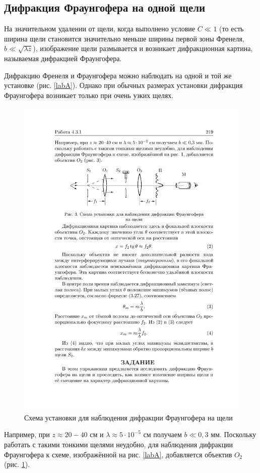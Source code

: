 \documentclass[a4paper,12pt]{article}
\theoremstyle{definition}
\begin{document}
\subsection{Дифракция Фраунгофера на одной щели}

На значительном удалении от щели, когда выполнено условие $ C \ll 1 $
(то есть ширина щели становится значительно меньше ширины первой
зоны Френеля, $ b \ll \sqrt{\lambda z} $), изображение щели размывается и возникает
дифракционная картина, называемая дифракцией Фраунгофера.

Дифракцию Френеля и Фраунгофера можно наблюдать на одной
и той же установке (рис. \ref{labA}). Однако при обычных размерах установки дифракция Фраунгофера возникает только при очень узких щелях.

\begin{figure}[h!]
	\centering
	\includegraphics[width=0.8\linewidth]{b.pdf}
	\caption{Схема установки для наблюдения дифракции Фраунгофера на щели}
	\label{labB}
\end{figure}

Например, при $ z \approx  20-40 $  см и $  \lambda \approx 5 \cdot 10^{-5}  $   см получаем $  b \ll 0,3 $ мм. Поскольку работать с такими тонкими щелями неудобно, для наблюдения дифракции Фраунгофера к схеме, изображённой на рис. \ref{labA}, добавляется объектив $ O_2  $ (рис. \ref{labB}).
\end{document}
